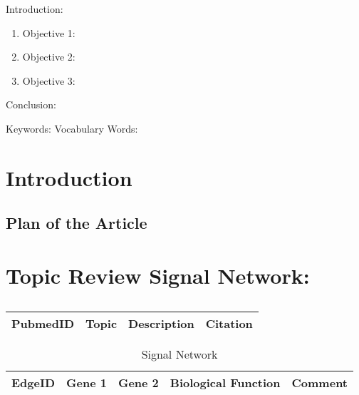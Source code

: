 

\twocolumn
\scriptsize
\begin{frontmatter}
		\title{}
		\author{}
		\address{The Mathematical Learning Space}
\end{frontmatter}	

Introduction:
\begin{enumerate}
\item Objective 1:
\item Objective 2:
\item Objective 3:
\end{enumerate}
Conclusion:

Keywords: 
Vocabulary Words:

\section{Introduction}

\subsection{Plan of the Article}

\begin{enumerate}
\end{enumerate}

\section{Topic Review Signal Network:}

\centering	
\begin{table}[H]\tiny
	\caption{}	
	\begin{tabular}{rp{1cm}|p{4cm}|l}
		\hline	
		PubmedID & Topic & Description & Citation \\
		\hline 
		\hline 
	\end{tabular}
\end{table}

\begin{table}[H]
\tiny
\begin{tabular}{p{1cm}p{1cm}p{3cm}p{1cm}p{1cm}} 
EdgeID & Gene 1 & Gene 2 & Biological Function & Comment \\
\hline
\hline
\end{tabular}
\caption{Signal Network}
\label{tab:Table2}
\end{table}

